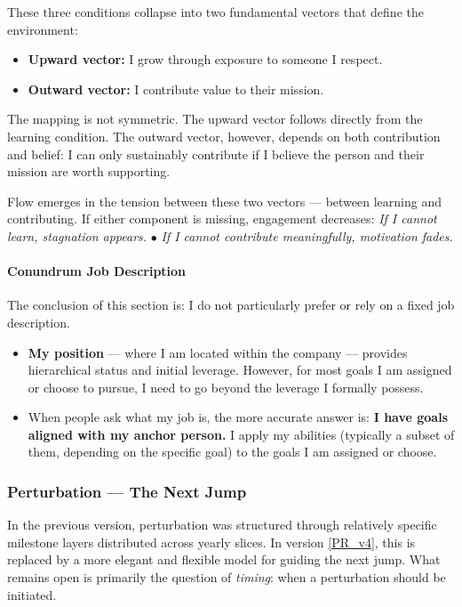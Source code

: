 These three conditions collapse into two fundamental vectors that define the environment:

\begin{itemize}
	\item \textbf{Upward vector:} I grow through exposure to someone I respect.
	\item \textbf{Outward vector:} I contribute value to their mission.
\end{itemize}

The mapping is not symmetric. The upward vector follows directly from the learning condition. The outward vector, however, depends on both contribution and belief: I can only sustainably contribute if I believe the person and their mission are worth supporting.

Flow emerges in the tension between these two vectors — between learning and contributing. If either component is missing, engagement decreases: \textit{If I cannot learn, stagnation appears.} $\bullet$ \textit{If I cannot contribute meaningfully, motivation fades.}


\paragraph{Conundrum Job Description}
The conclusion of this section is: I do not particularly prefer or rely on a fixed job description. 

\begin{itemize}
	\item \textbf{My position} — where I am located within the company — provides hierarchical status and initial leverage. However, for most goals I am assigned or choose to pursue, I need to go beyond the leverage I formally possess.
	\item When people ask what my job is, the more accurate answer is: \textbf{I have goals aligned with my anchor person.} I apply my abilities (typically a subset of them, depending on the specific goal) to the goals I am assigned or choose.
\end{itemize}


\subsubsection{Perturbation — The Next Jump}

In the previous version, perturbation was structured through relatively specific milestone layers distributed across yearly slices. In version \ref{PR_v4}, this is replaced by a more elegant and flexible model for guiding the next jump. What remains open is primarily the question of \emph{timing}: when a perturbation should be initiated.


